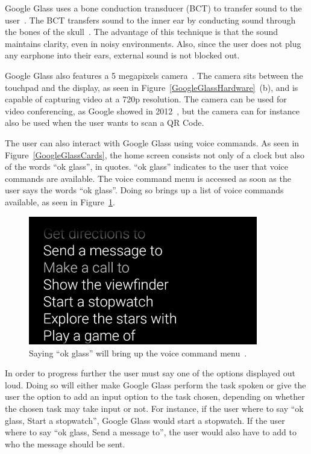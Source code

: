 Google Glass uses a bone conduction transducer (BCT) to transfer sound to the user~\cite{GlassSpecs}. The BCT transfers sound to the inner ear by conducting sound through the bones of the skull~\cite{boneConductionWiki}. The advantage of this technique is that the sound maintains clarity, even in noisy environments. Also, since the user does not plug any earphone into their ears, external sound is not blocked out.

Google Glass also features a 5 megapixels camera~\cite{GlassSpecs}. The camera sits between the touchpad and the display, as seen in Figure~\ref{GoogleGlassHardware}~(b), and is capable of capturing video at a 720p resolution. The camera can be used for video conferencing, as Google showed in 2012~\cite{glassLiveDemo}, but the camera can for instance also be used when the user wants to scan a QR Code.

The user can also interact with Google Glass using voice commands. As seen in Figure~\ref{GoogleGlassCards}, the home screen consists not only of a clock but also of the words ``ok glass'', in quotes. ``ok glass'' indicates to the user that voice commands are available. The voice command menu is accessed as soon as the user says the words ``ok glass''. Doing so brings up a list of voice commands available, as seen in Figure~\ref{voiceCommandMenu}.

	\begin{figure}[H]%
		\centering
		\includegraphics[width=100mm]{images/glassVoiceMenu}
		\caption{Saying ``ok glass'' will bring up the voice command menu~\cite{googleGlassVoiceCommand}.}
		\label{voiceCommandMenu}
	\end{figure}

In order to progress further the user must say one of the options displayed out loud. Doing so will either make Google Glass perform the task spoken or give the user the option to add an input option to the task chosen, depending on whether the chosen task may take input or not. For instance, if the user where to say ``ok glass, Start a stopwatch'', Google Glass would start a stopwatch. If the user where to say ``ok glass, Send a message to'', the user would also have to add to who the message should be sent.

